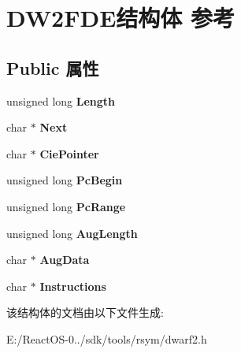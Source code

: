 \hypertarget{struct_d_w2_f_d_e}{}\section{D\+W2\+F\+D\+E结构体 参考}
\label{struct_d_w2_f_d_e}
\subsection*{Public 属性}
\begin{DoxyCompactItemize}
\item 
\mbox{\label{struct_d_w2_f_d_e_ac9845c76eb19ed2fa3c2eb1e435c014c}} 
unsigned long {\bfseries Length}
\item 
\mbox{\label{struct_d_w2_f_d_e_a2683102bbbb762b8b6bccb232009edc5}} 
char $\ast$ {\bfseries Next}
\item 
\mbox{\label{struct_d_w2_f_d_e_a362dce37fca0f6a26a62aec75e820c36}} 
char $\ast$ {\bfseries Cie\+Pointer}
\item 
\mbox{\label{struct_d_w2_f_d_e_a9f1ba18c311a08ca1c977846ed7853bd}} 
unsigned long {\bfseries Pc\+Begin}
\item 
\mbox{\label{struct_d_w2_f_d_e_aa6288b22db2b492640cc9cc6597043fd}} 
unsigned long {\bfseries Pc\+Range}
\item 
\mbox{\label{struct_d_w2_f_d_e_aef64d0cbb10302698fde8d84063564b5}} 
unsigned long {\bfseries Aug\+Length}
\item 
\mbox{\label{struct_d_w2_f_d_e_ae488f0e036d24d4cdc78847d78d25a0c}} 
char $\ast$ {\bfseries Aug\+Data}
\item 
\mbox{\label{struct_d_w2_f_d_e_a22dd1ef5b1faa09ead8a8f1a893abb25}} 
char $\ast$ {\bfseries Instructions}
\end{DoxyCompactItemize}


该结构体的文档由以下文件生成\+:\begin{DoxyCompactItemize}
\item 
E\+:/\+React\+O\+S-\/0../sdk/tools/rsym/dwarf2.\+h\end{DoxyCompactItemize}
